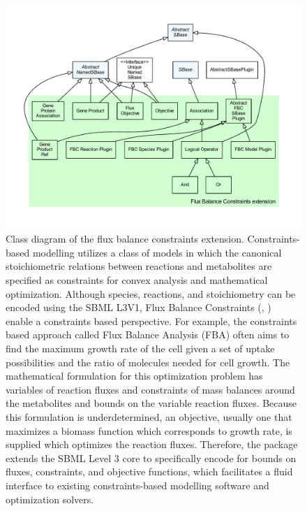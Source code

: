 \begin{figure}[hb]
 \centering
 \vspace*{2ex}
 \includegraphics[width=\textwidth]{../../../extensions/fbc/doc/img/type_hierarchy.pdf}
 \caption[Class diagram of the flux balance constraints extension.]{Class diagram of the flux balance constraints extension. Constraints-based modelling \cite{lewis2012} utilizes a class of models in which
the canonical stoichiometric relations between reactions and metabolites are specified
as constraints for convex analysis and mathematical optimization. Although species,
reactions, and stoichiometry can be encoded using the SBML L3V1,
Flux Balance Constraints (, \cite{olivier2013}) enable a constraints
based perspective. For example, the constraints based approach called
Flux Balance Analysis (FBA) often aims to find the maximum growth rate of the
cell given a set of uptake possibilities and the ratio of molecules needed
for cell growth. The mathematical formulation for this optimization problem
has variables of reaction fluxes and constraints of mass balances around the
metabolites and bounds on the variable reaction fluxes. Because this formulation is
underdetermined, an objective, usually one that maximizes a biomass function which
corresponds to growth rate, is supplied which optimizes the reaction fluxes. Therefore,
the  package extends the SBML Level 3 core to specifically encode for bounds on
fluxes, constraints, and objective functions, which facilitates a fluid interface to
existing constraints-based modelling software and optimization solvers.}
 \label{fig:fbc}
\end{figure}

